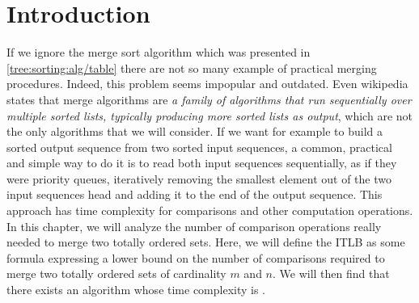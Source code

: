 \section{Introduction}
\label{tree:merging:intro}

If we ignore the merge sort algorithm which was presented in
\ref{tree:sorting:alg/table} there are not so many example of practical merging
procedures. Indeed, this problem seems impopular and outdated. Even wikipedia
states that merge algorithms are \emph{a family of algorithms that run
sequentially over multiple sorted lists, typically producing more sorted lists
as output}, which are not the only algorithms that we will consider. If we want
for example to build a sorted output sequence from two sorted input sequences,
a common, practical and simple way to do it is to read both input sequences
sequentially, as if they were priority queues, iteratively removing the
smallest element out of the two input sequences head and adding it to the end
of the output sequence. This approach has  time complexity for
comparisons and other computation operations. In this chapter, we will analyze
the number of comparison operations really needed to merge two totally ordered
sets. Here, we will define the ITLB as some formula expressing a lower bound on
the number of comparisons required to merge two totally ordered sets of
cardinality $m$ and $n$. We will then find that there exists an algorithm whose
time complexity is .

